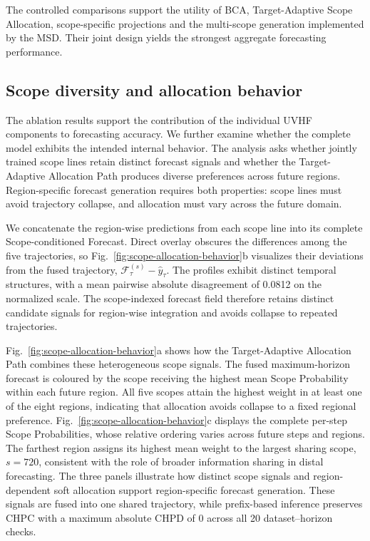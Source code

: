 \documentclass[final,3p,times]{elsarticle}
\newif\ifshowrevisions
\newcommand{\rev}[1]{\ifshowrevisions\textcolor{revisionblue}{#1}\else#1\fi}
\begin{document}
The controlled comparisons support the utility of \rev{BCA, Target-Adaptive Scope Allocation, scope-specific projections and the multi-scope generation implemented by the MSD}. Their joint design yields the strongest aggregate forecasting performance.

\subsection{Scope diversity and allocation behavior}
\label{sec:scope-behavior}


The ablation results support the contribution of the individual \rev{UVHF components} to forecasting accuracy. We further examine whether the complete model exhibits the intended internal behavior. The analysis asks whether jointly trained scope lines retain distinct forecast signals and whether the Target-Adaptive Allocation Path produces diverse preferences across future regions. Region-specific forecast generation requires both properties: scope lines must avoid trajectory collapse, and allocation must vary across the future domain.

We concatenate the region-wise predictions from each scope line into its complete Scope-conditioned Forecast. Direct overlay obscures the differences among the five trajectories, so Fig.~\ref{fig:scope-allocation-behavior}b visualizes their deviations from the fused trajectory, $\mathcal F_\tau^{(s)}-\widehat y_\tau$. The profiles exhibit distinct temporal structures, with a mean pairwise absolute disagreement of 0.0812 on the normalized scale. The scope-indexed forecast field therefore retains distinct candidate signals for region-wise integration and avoids collapse to repeated trajectories.

Fig.~\ref{fig:scope-allocation-behavior}a shows how the Target-Adaptive Allocation Path combines these heterogeneous scope signals. The fused maximum-horizon forecast is coloured by the scope receiving the highest mean Scope Probability within each future region. All five scopes attain the highest weight in at least one of the eight regions, indicating that allocation avoids collapse to a fixed regional preference. Fig.~\ref{fig:scope-allocation-behavior}c displays the complete per-step Scope Probabilities, whose relative ordering varies across future steps and regions. The farthest region assigns its highest mean weight to the largest sharing scope, $s=720$, consistent with the role of broader information sharing in distal forecasting. The three panels illustrate how distinct scope signals and region-dependent soft allocation support region-specific forecast generation. These signals are fused into one shared trajectory, while prefix-based inference preserves CHPC with a maximum absolute CHPD of 0 across all 20 dataset--horizon checks.
\end{document}

